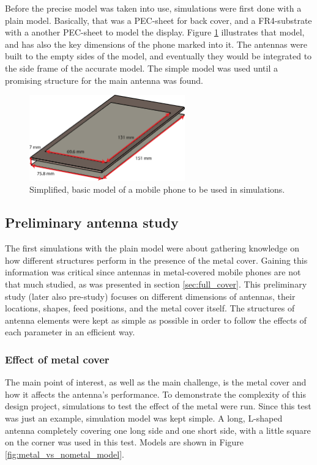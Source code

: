 Before the precise model was taken into use, simulations were first done with a plain model. Basically, that was a PEC-sheet for back cover, and a FR4-substrate with a another PEC-sheet to model the display. Figure \ref{fig:basic_structure} illustrates that model, and has also the key dimensions of the phone marked into it. The antennas were built to the empty sides of the model, and eventually they would be integrated to the side frame of the accurate model. The simple model was used until a promising structure for the main antenna was found. 
\begin{figure}[H]
    \centering
    \includegraphics[width=0.6\textwidth]{img/basic_structure.eps}
    \caption{Simplified, basic model of a mobile phone to be used in simulations.}
    \label{fig:basic_structure}
\end{figure}

\subsection{Preliminary antenna study}
\label{sec:pre_study}
The first simulations with the plain model were about gathering knowledge on how different structures perform in the presence of the metal cover. Gaining this information was critical since antennas in metal-covered mobile phones are not that much studied, as was presented in section \ref{sec:full_cover}. This preliminary study (later also pre-study) focuses on different dimensions of antennas, their locations, shapes, feed positions, and the metal cover itself. The structures of antenna elements were kept as simple as possible in order to follow the effects of each parameter in an efficient way. 


\subsubsection{Effect of metal cover}
\label{sec:metal_effect}
The main point of interest, as well as the main challenge, is the metal cover and how it affects the antenna's performance. To demonstrate the complexity of this design project, simulations to test the effect of the metal were run. Since this test was just an example, simulation model was kept simple. A long, L-shaped antenna completely covering one long side and one short side, with a little square on the corner was used in this test. Models are shown in Figure \ref{fig:metal_vs_nometal_model}.

